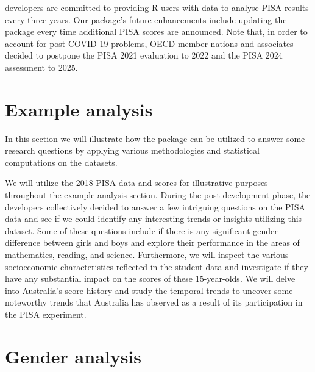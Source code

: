  developers are committed to providing R users with data to analyse PISA results every three years. Our package's future enhancements include updating the package every time additional PISA scores are announced. Note that, in order to account for post COVID-19 problems, OECD member nations and associates decided to postpone the PISA 2021 evaluation to 2022 and the PISA 2024 assessment to 2025.

\hypertarget{example-analysis}{%
\section{Example analysis}\label{example-analysis}}

In this section we will illustrate how the  package can be utilized to answer some research questions by applying various methodologies and statistical computations on the  datasets.

We will utilize the 2018 PISA data and scores for illustrative purposes throughout the example analysis section. During the post-development phase, the  developers collectively decided to answer a few intriguing questions on the PISA data and see if we could identify any interesting trends or insights utilizing this dataset. Some of these questions include if there is any significant gender difference between girls and boys and explore their performance in the areas of mathematics, reading, and science. Furthermore, we will inspect the various socioeconomic characteristics reflected in the student data and investigate if they have any substantial impact on the scores of these 15-year-olds. We will delve into Australia's score history and study the temporal trends to uncover some noteworthy trends that Australia has observed as a result of its participation in the PISA experiment.

\hypertarget{gender-analysis}{%
\section{Gender analysis}\label{gender-analysis}}

